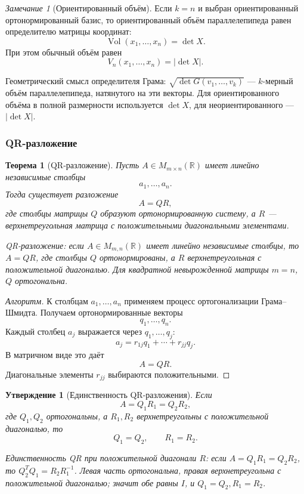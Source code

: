 \documentclass[12pt,a4paper]{article}
\theoremstyle{definition}
\theoremstyle{plain}
\newtheorem{theorem}[definition]{Теорема}
\newtheorem{proposition}[definition]{Утверждение}
\theoremstyle{remark}
\newtheorem{remark}[definition]{Замечание}
\newenvironment{knowledgefix}{\begin{clarifybox}}{\end{clarifybox}}
\newcommand{\R}{\mathbb{R}}
\newcommand{\Vol}{\operatorname{Vol}}
\begin{document}
\begin{remark}[Ориентированный объём]
Если $k=n$ и выбран ориентированный ортонормированный базис, то ориентированный объём параллелепипеда равен определителю матрицы координат:
\[
    \Vol(x_1,\ldots,x_n)=\det X.
\]
При этом обычный объём равен
\[
    V_n(x_1,\ldots,x_n)=|\det X|.
\]
\begin{knowledgefix}
Геометрический смысл определителя Грама: \(\sqrt{\det G(v_1,
\ldots,v_k)}\) — \(k\)-мерный объём параллелепипеда, натянутого на эти векторы. Для ориентированного объёма в полной размерности используется \(\det X\), для неориентированного — \(|\det X|\).
\end{knowledgefix}
\end{remark}

\subsubsection{QR-разложение}


\begin{theorem}[QR-разложение]
Пусть $A\in M_{m\times n}(\R)$ имеет линейно независимые столбцы
\[
    a_1,\ldots,a_n.
\]
Тогда существует разложение
\[
    A=QR,
\]
где столбцы матрицы $Q$ образуют ортонормированную систему, а $R$ --- верхнетреугольная матрица с положительными диагональными элементами.
\begin{knowledgefix}
QR-разложение: если \(A\in M_{m,n}(\R)\) имеет линейно независимые столбцы, то \(A=QR\), где столбцы \(Q\) ортонормированы, а \(R\) верхнетреугольная с положительной диагональю. Для квадратной невырожденной матрицы \(m=n\), \(Q\) ортогональна.
\end{knowledgefix}
\end{theorem}

\begin{proof}[Алгоритм]
К столбцам $a_1,\ldots,a_n$ применяем процесс ортогонализации Грама--Шмидта.
Получаем ортонормированные векторы
\[
    q_1,\ldots,q_n.
\]
Каждый столбец $a_j$ выражается через $q_1,\ldots,q_j$:
\[
    a_j=r_{1j}q_1+\cdots+r_{jj}q_j.
\]
В матричном виде это даёт
\[
    A=QR.
\]
Диагональные элементы $r_{jj}$ выбираются положительными.
\end{proof}

\begin{proposition}[Единственность QR-разложения]
Если
\[
    A=Q_1R_1=Q_2R_2,
\]
где $Q_1,Q_2$ ортогональны, а $R_1,R_2$ верхнетреугольны с положительной диагональю, то
\[
    Q_1=Q_2,
    \qquad
    R_1=R_2.
\]
\begin{knowledgefix}
Единственность QR при положительной диагонали \(R\): если \(A=Q_1R_1=Q_2R_2\), то \(Q_2^TQ_1=R_2R_1^{-1}\). Левая часть ортогональна, правая верхнетреугольна с положительной диагональю; значит обе равны \(I\), и \(Q_1=Q_2, R_1=R_2\).
\end{knowledgefix}
\end{proposition}
\end{document}
